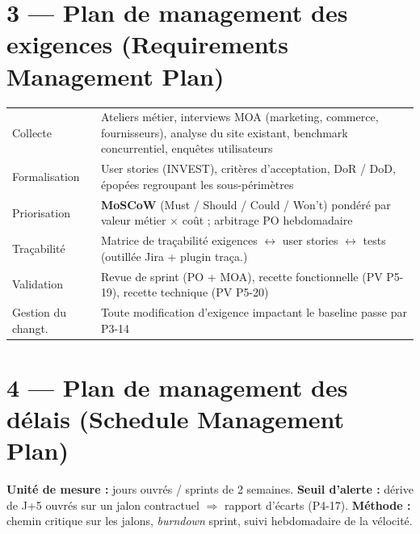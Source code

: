 \documentclass[11pt,a4paper,oneside]{report}
\begin{document}
\section*{3 — Plan de management des exigences (Requirements Management Plan)}

\renewcommand{\arraystretch}{1.3}
\begin{tabularx}{\textwidth}{L{4cm} Y}
\toprule
{} &  \\
\midrule
Collecte          & Ateliers métier, interviews MOA (marketing, commerce, fournisseurs), analyse du site existant, benchmark concurrentiel, enquêtes utilisateurs \\
Formalisation     & User stories (INVEST), critères d'acceptation, DoR / DoD, épopées regroupant les sous-périmètres \\
Priorisation      & \textbf{MoSCoW} (Must / Should / Could / Won't) pondéré par valeur métier × coût ; arbitrage PO hebdomadaire \\
Traçabilité       & Matrice de traçabilité exigences $\leftrightarrow$ user stories $\leftrightarrow$ tests (outillée Jira + plugin traça.) \\
Validation        & Revue de sprint (PO + MOA), recette fonctionnelle (PV P5-19), recette technique (PV P5-20) \\
Gestion du changt.& Toute modification d'exigence impactant le baseline passe par P3-14 \\
\bottomrule
\end{tabularx}

\section*{4 — Plan de management des délais (Schedule Management Plan)}

\textbf{Unité de mesure :} jours ouvrés / sprints de 2 semaines. \textbf{Seuil d'alerte :}
dérive de J+5 ouvrés sur un jalon contractuel $\Rightarrow$ rapport d'écarts (P4-17).
\textbf{Méthode :} chemin critique sur les jalons, \textit{burndown} sprint, suivi
hebdomadaire de la vélocité.
\end{document}
